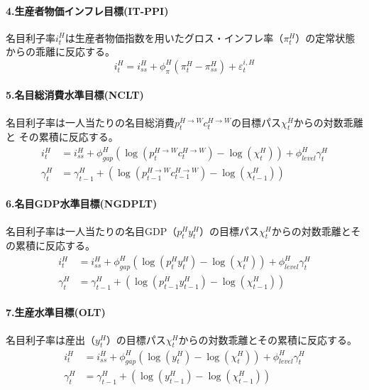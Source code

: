 \paragraph{4.生産者物価インフレ目標(IT-PPI)}
\label{sec:chapter3_policies_monetary_home_it_ppi}
名目利子率\(i_t^H\)は生産者物価指数を用いたグロス・インフレ率（\(\pi_t^H\)）の定常状態からの乖離に反応する。
\begin{equation}
\label{form:chapter3_policies_monetary_home_it_ppi_i_H_eq}
    i_t^H=i_{ss}^H+\phi_{\pi}^H(\pi_t^H-\pi_{ss}^H)+\varepsilon_t^{i,H}
\end{equation}

\paragraph{5.名目総消費水準目標(NCLT)}
\label{sec:chapter3_policies_monetary_home_nclt}
名目利子率は一人当たりの名目総消費\(p_t^{H\to W}c_t^{H\to W}\)の目標パス\(\chi_t^H\)からの対数乖離と
その累積に反応する。
\begin{align}
\label{form:chapter3_policies_monetary_home_nclt_i_H_eq}
    i_t^H&=i_{ss}^H+\phi_{gap}^H(\log(p_t^{H\to W}c_t^{H\to W})-\log(\chi_t^H))+\phi_{level}^H\gamma_t^H \\
\label{form:chapter3_policies_monetary_home_nclt_gamma_H_eq}
    \gamma_t^H&=\gamma_{t-1}^H+(\log(p_{t-1}^{H\to W}c_{t-1}^{H\to W})-\log(\chi_{t-1}^H))
\end{align}

\paragraph{6.名目GDP水準目標(NGDPLT)}
\label{sec:chapter3_policies_monetary_home_ngdplt}
名目利子率は一人当たりの名目GDP（\(p_t^Hy_t^H\)）の目標パス\(\chi_t^H\)からの対数乖離とその累積に反応する。
\begin{align}
\label{form:chapter3_policies_monetary_home_ngdplt_i_H_eq}
    i_t^H&=i_{ss}^H+\phi_{gap}^H(\log(p_t^Hy_t^H)-\log(\chi_t^H))+\phi_{level}^H\gamma_t^H \\
\label{form:chapter3_policies_monetary_home_ngdplt_gamma_H_eq}
    \gamma_t^H&=\gamma_{t-1}^H+(\log(p_{t-1}^Hy_{t-1}^H)-\log(\chi_{t-1}^H))
\end{align}

\paragraph{7.生産水準目標(OLT)}
\label{sec:chapter3_policies_monetary_home_olt}
名目利子率は産出（\(y_t^H\)）の目標パス\(\chi_t^H\)からの対数乖離とその累積に反応する。
\begin{align}
\label{form:chapter3_policies_monetary_home_olt_i_H_eq}
    i_t^H&=i_{ss}^H+\phi_{gap}^H(\log(y_t^H)-\log(\chi_t^H))+\phi_{level}^H\gamma_t^H \\
\label{form:chapter3_policies_monetary_home_olt_gamma_H_eq}
    \gamma_t^H&=\gamma_{t-1}^H+(\log(y_{t-1}^H)-\log(\chi_{t-1}^H))
\end{align}

